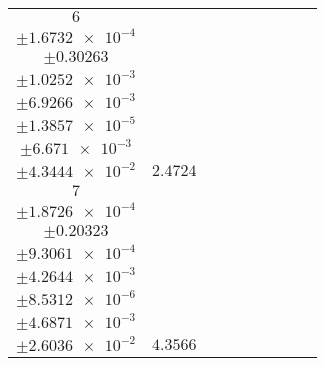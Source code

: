 \documentclass[8pt]{article}
\begin{document}
\begin{longtable}[l]{c c c c c c c c c}
$\num{6}$ & \begin{tabular}[c]{@{}c@{}}$\num{3.1055e-2}$ \\ $\pm\num{1.6732e-4}$\end{tabular} & \begin{tabular}[c]{@{}c@{}}$\num{0.95403}$ \\ $\pm\num{0.30263}$\end{tabular} & \begin{tabular}[c]{@{}c@{}}$\num{7.9056}$ \\ $\pm\num{1.0252e-3}$\end{tabular} & \begin{tabular}[c]{@{}c@{}}$\num{3.5553e+3}$ \\ $\pm\num{6.9266e-3}$\end{tabular} & \begin{tabular}[c]{@{}c@{}}$\num{7.1126}$ \\ $\pm\num{1.3857e-5}$\end{tabular} & \begin{tabular}[c]{@{}c@{}}$\num{1.2204}$ \\ $\pm\num{6.671e-3}$\end{tabular} & \begin{tabular}[c]{@{}c@{}}$\num{4.2335}$ \\ $\pm\num{4.3444e-2}$\end{tabular} & $\num{2.4724}$\\
$\num{7}$ & \begin{tabular}[c]{@{}c@{}}$\num{5.9317e-2}$ \\ $\pm\num{1.8726e-4}$\end{tabular} & \begin{tabular}[c]{@{}c@{}}$\num{-0.15483}$ \\ $\pm\num{0.20323}$\end{tabular} & \begin{tabular}[c]{@{}c@{}}$\num{-4.3307}$ \\ $\pm\num{9.3061e-4}$\end{tabular} & \begin{tabular}[c]{@{}c@{}}$\num{3.5786e+3}$ \\ $\pm\num{4.2644e-3}$\end{tabular} & \begin{tabular}[c]{@{}c@{}}$\num{7.1591}$ \\ $\pm\num{8.5312e-6}$\end{tabular} & \begin{tabular}[c]{@{}c@{}}$\num{1.6307}$ \\ $\pm\num{4.6871e-3}$\end{tabular} & \begin{tabular}[c]{@{}c@{}}$\num{4.1037}$ \\ $\pm\num{2.6036e-2}$\end{tabular} & $\num{4.3566}$\\

\end{longtable}
\end{document}
